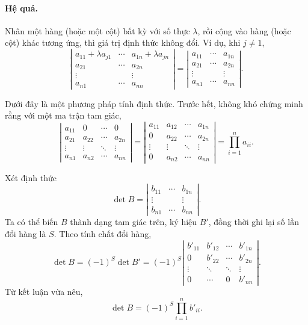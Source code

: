 \documentclass[11pt]{article}
\begin{document}
\paragraph{Hệ quả.}
Nhân một hàng (hoặc một cột) bất kỳ với số thực \(\lambda\), rồi cộng vào hàng
(hoặc cột) khác tương ứng, thì giá trị định thức không đổi. Ví dụ, khi
\(j\ne 1\),
\[
\left|\begin{matrix}
a_{11}+\lambda a_{j1}&\cdots&a_{1n}+\lambda a_{jn}\\
a_{21}&\cdots&a_{2n}\\
\vdots&&\vdots\\
a_{n1}&\cdots&a_{nn}
\end{matrix}\right|
=
\left|\begin{matrix}
a_{11}&\cdots&a_{1n}\\
a_{21}&\cdots&a_{2n}\\
\vdots&&\vdots\\
a_{n1}&\cdots&a_{nn}
\end{matrix}\right|.
\]

Dưới đây là một phương pháp tính định thức. Trước hết, không khó chứng minh
rằng với một ma trận tam giác,
\[
\left|\begin{matrix}
a_{11}&0&\cdots&0\\
a_{21}&a_{22}&\cdots&a_{2n}\\
\vdots&\vdots&\ddots&\vdots\\
a_{n1}&a_{n2}&\cdots&a_{nn}
\end{matrix}\right|
=
\left|\begin{matrix}
a_{11}&a_{12}&\cdots&a_{1n}\\
0&a_{22}&\cdots&a_{2n}\\
\vdots&\vdots&\ddots&\vdots\\
0&a_{n2}&\cdots&a_{nn}
\end{matrix}\right|
=
\prod_{i=1}^n a_{ii}.
\]

Xét định thức
\[
  \det B=
  \left|\begin{matrix}
  b_{11}&\cdots&b_{1n}\\
  \vdots&&\vdots\\
  b_{n1}&\cdots&b_{nn}
  \end{matrix}\right|.
\]
Ta có thể biến \(B\) thành dạng tam giác trên, ký hiệu \(B'\), đồng thời ghi
lại số lần đổi hàng là \(S\). Theo tính chất đổi hàng,
\[
  \det B=(-1)^S\det B'
  =
  (-1)^S
  \left|\begin{matrix}
  b'_{11}&b'_{12}&\cdots&b'_{1n}\\
  0&b'_{22}&\cdots&b'_{2n}\\
  \vdots&\ddots&\ddots&\vdots\\
  0&\cdots&0&b'_{nn}
  \end{matrix}\right|.
\]
Từ kết luận vừa nêu,
\[
  \det B=(-1)^S\prod_{i=1}^n b'_{ii}.
\]
\end{document}
